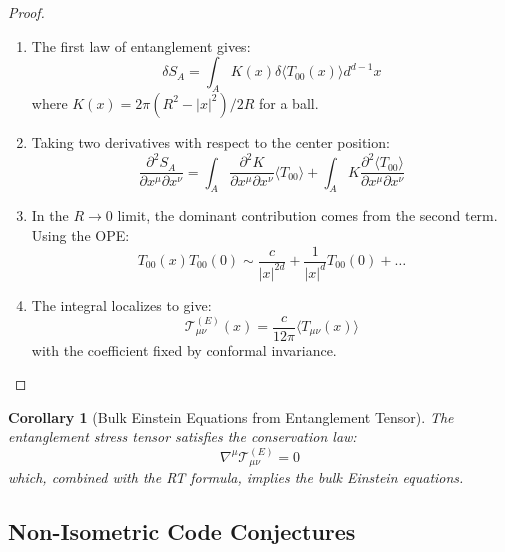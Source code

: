 \documentclass[12pt,a4paper]{article}
\newtheorem{corollary}[theorem]{Corollary}
\begin{document}
\begin{proof}
\begin{enumerate}
    \item The first law of entanglement gives:
    \begin{equation}
    \delta S_A = \int_A K(x) \delta\langle T_{00}(x) \rangle d^{d-1}x
    \end{equation}
    where $K(x) = 2\pi(R^2 - |x|^2)/2R$ for a ball.
    
    \item Taking two derivatives with respect to the center position:
    \begin{equation}
    \frac{\partial^2 S_A}{\partial x^\mu \partial x^\nu} = \int_A \frac{\partial^2 K}{\partial x^\mu \partial x^\nu} \langle T_{00} \rangle + \int_A K \frac{\partial^2 \langle T_{00} \rangle}{\partial x^\mu \partial x^\nu}
    \end{equation}
    
    \item In the $R \to 0$ limit, the dominant contribution comes from the second term. Using the OPE:
    \begin{equation}
    T_{00}(x) T_{00}(0) \sim \frac{c}{|x|^{2d}} + \frac{1}{|x|^d} T_{00}(0) + \ldots
    \end{equation}
    
    \item The integral localizes to give:
    \begin{equation}
    \mathcal{T}^{(E)}_{\mu\nu}(x) = \frac{c}{12\pi} \langle T_{\mu\nu}(x) \rangle
    \end{equation}
    with the coefficient fixed by conformal invariance.
\end{enumerate}
\end{proof}

\begin{corollary}[Bulk Einstein Equations from Entanglement Tensor]
The entanglement stress tensor satisfies the conservation law:
\begin{equation}
\nabla^\mu \mathcal{T}^{(E)}_{\mu\nu} = 0
\end{equation}
which, combined with the RT formula, implies the bulk Einstein equations.
\end{corollary}

\subsection{Non-Isometric Code Conjectures}
\end{document}
